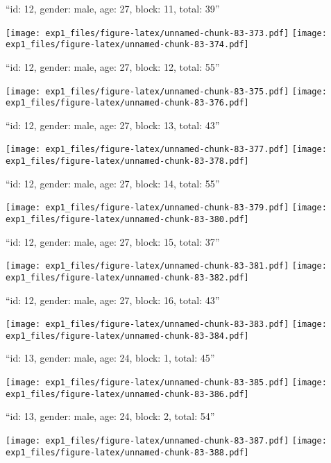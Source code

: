 \documentclass[11pt,,]{article}
\begin{document}
\newpage
[1] 

``id: 12, gender: male, age: 27, block: 11, total: 39''

\texttt{[image: exp1\_files/figure-latex/unnamed-chunk-83-373.pdf]}
\texttt{[image: exp1\_files/figure-latex/unnamed-chunk-83-374.pdf]}

\newpage
[1] 

``id: 12, gender: male, age: 27, block: 12, total: 55''

\texttt{[image: exp1\_files/figure-latex/unnamed-chunk-83-375.pdf]}
\texttt{[image: exp1\_files/figure-latex/unnamed-chunk-83-376.pdf]}

\newpage
[1] 

``id: 12, gender: male, age: 27, block: 13, total: 43''

\texttt{[image: exp1\_files/figure-latex/unnamed-chunk-83-377.pdf]}
\texttt{[image: exp1\_files/figure-latex/unnamed-chunk-83-378.pdf]}

\newpage
[1] 

``id: 12, gender: male, age: 27, block: 14, total: 55''

\texttt{[image: exp1\_files/figure-latex/unnamed-chunk-83-379.pdf]}
\texttt{[image: exp1\_files/figure-latex/unnamed-chunk-83-380.pdf]}

\newpage
[1] 

``id: 12, gender: male, age: 27, block: 15, total: 37''

\texttt{[image: exp1\_files/figure-latex/unnamed-chunk-83-381.pdf]}
\texttt{[image: exp1\_files/figure-latex/unnamed-chunk-83-382.pdf]}

\newpage
[1] 

``id: 12, gender: male, age: 27, block: 16, total: 43''

\texttt{[image: exp1\_files/figure-latex/unnamed-chunk-83-383.pdf]}
\texttt{[image: exp1\_files/figure-latex/unnamed-chunk-83-384.pdf]}

\newpage
[1] 

``id: 13, gender: male, age: 24, block: 1, total: 45''

\texttt{[image: exp1\_files/figure-latex/unnamed-chunk-83-385.pdf]}
\texttt{[image: exp1\_files/figure-latex/unnamed-chunk-83-386.pdf]}

\newpage
[1] 

``id: 13, gender: male, age: 24, block: 2, total: 54''

\texttt{[image: exp1\_files/figure-latex/unnamed-chunk-83-387.pdf]}
\texttt{[image: exp1\_files/figure-latex/unnamed-chunk-83-388.pdf]}
\end{document}
